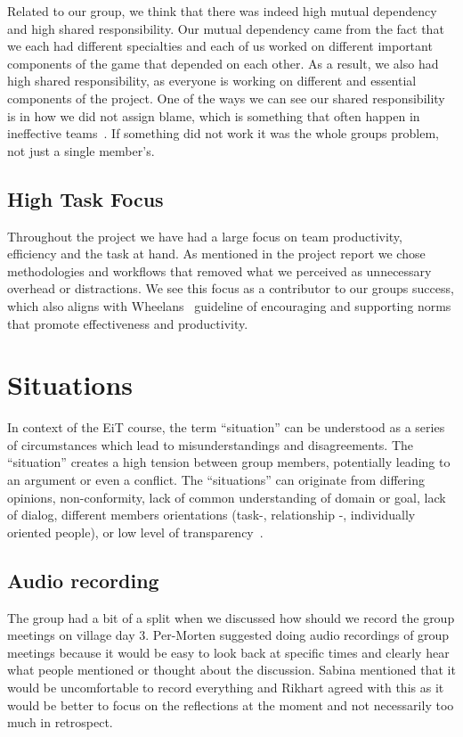 Related to our group, we think that there was indeed high mutual dependency and high shared responsibility. Our mutual dependency came from the fact that we each had different specialties and each of us worked on different important components of the game that depended on each other. As a result, we also had high shared responsibility, as everyone is working on different and essential components of the project. One of the ways we can see our shared responsibility is in how we did not assign blame, which is something that often happen in ineffective teams~\cite{wheelan}. If something did not work it was the whole groups problem, not just a single member’s.

\subsection{High Task Focus}
Throughout the project we have had a large focus on team productivity, efficiency and the task at hand. As mentioned in the project report we chose methodologies and workflows that removed what we perceived as unnecessary overhead or distractions. We see this focus as a contributor to our groups success, which also aligns with Wheelans~\cite{wheelan} guideline of encouraging and supporting norms that promote effectiveness and productivity. 

\section{Situations}
In context of the EiT course, the term “situation” can be understood as a series of circumstances which lead to misunderstandings and disagreements. The “situation” creates a high tension between group members, potentially leading to an argument or even a conflict. The “situations” can originate from differing opinions, non-conformity, lack of common understanding of domain or goal, lack of dialog, different members orientations (task-, relationship -, individually oriented people), or low level of transparency~\cite{ntnu_eit_book}.
\subsection{Audio recording}
The group had a bit of a split when we discussed how should we record the group meetings on village day 3. Per-Morten suggested doing audio recordings of group meetings because it would be easy to look back at specific times and clearly hear what people mentioned or thought about the discussion. Sabina mentioned that it would be uncomfortable to record everything and Rikhart agreed with this as it would be better to focus on the reflections at the moment and not necessarily too much in retrospect.

